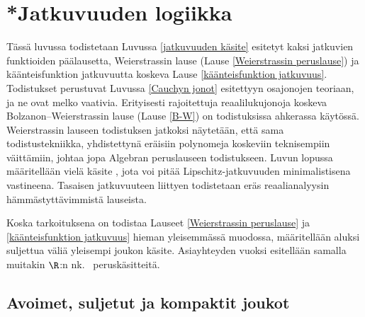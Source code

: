 \section{*Jatkuvuuden logiikka} \label{jatkuvuuden logiikka}
\alku

Tässä luvussa todistetaan Luvussa \ref{jatkuvuuden käsite} esitetyt kaksi jatkuvien
funktioiden päälausetta, Weierstrassin lause (Lause \ref{Weierstrassin peruslause}) ja
käänteisfunktion jatkuvuutta koskeva Lause \ref{käänteisfunktion jatkuvuus}. Todistukset
perustuvat Luvussa \ref{Cauchyn jonot} esitettyyn osajonojen teoriaan, ja ne ovat melko
vaativia. Erityisesti rajoitettuja reaalilukujonoja koskeva Bolzanon--Weierstrassin lause
(Lause \ref{B-W}) on todistuksissa ahkerassa käytössä. Weierstrassin lauseen todistuksen
jatkoksi näytetään, että sama todistustekniikka, yhdistettynä eräisiin polynomeja koskeviin
teknisempiin väittämiin, johtaa jopa Algebran peruslauseen todistukseen. Luvun lopussa
määritellään vielä käsite , jota voi pitää Lipschitz-jatkuvuuden
minimalistisena vastineena. Tasaisen jatkuvuuteen liittyen todistetaan eräs reaalianalyysin
hämmästyttävimmistä lauseista.

Koska tarkoituksena on todistaa Lauseet \ref{Weierstrassin peruslause} ja 
\ref{käänteisfunktion jatkuvuus} hieman yleisemmässä muodossa, määritellään aluksi
suljettua väliä yleisempi  joukon käsite. Asiayhteyden vuoksi esitellään
samalla muitakin $\R$:n nk.\  peruskäsitteitä.
 
\subsection*{Avoimet, suljetut ja kompaktit joukot}

